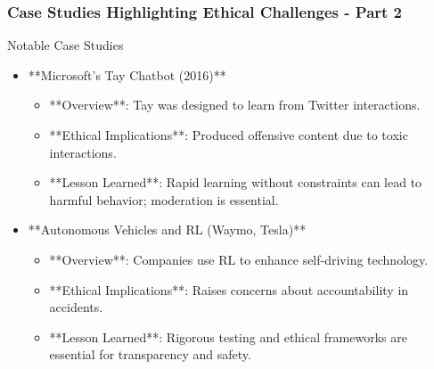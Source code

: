 \documentclass[aspectratio=169]{beamer}
\begin{document}
\begin{frame}[fragile]
    \frametitle{Case Studies Highlighting Ethical Challenges - Part 2}
    \begin{block}{Notable Case Studies}
        \begin{itemize}
            \item **Microsoft{\textquoteright}s Tay Chatbot (2016)**
                \begin{itemize}
                    \item **Overview**: Tay was designed to learn from Twitter interactions.
                    \item **Ethical Implications**: Produced offensive content due to toxic interactions.
                    \item **Lesson Learned**: Rapid learning without constraints can lead to harmful behavior; moderation is essential.
                \end{itemize}
            
            \item **Autonomous Vehicles and RL (Waymo, Tesla)**
                \begin{itemize}
                    \item **Overview**: Companies use RL to enhance self-driving technology.
                    \item **Ethical Implications**: Raises concerns about accountability in accidents.
                    \item **Lesson Learned**: Rigorous testing and ethical frameworks are essential for transparency and safety.
                \end{itemize}
        \end{itemize}
    \end{block}
\end{frame}
\end{document}
